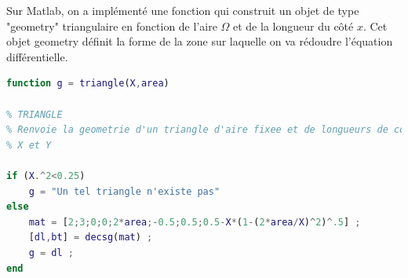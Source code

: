 \documentclass[a4paper,reqno]{article}
\begin{document}
Sur Matlab, on a implémenté une fonction qui construit un objet de type "geometry" triangulaire en fonction de l'aire $\Omega$ et de la longueur du côté $x$. Cet objet geometry définit la forme de la zone sur laquelle on va rédoudre l'équation différentielle. 

\newpage

\begin{lstlisting}[language=Matlab,frame=single,caption=Construction d'une géométrie Triangulaire]
function g = triangle(X,area)

% TRIANGLE
% Renvoie la geometrie d'un triangle d'aire fixee et de longueurs de cote 
% X et Y 

if (X.^2<0.25)
    g = "Un tel triangle n'existe pas" 
else 
    mat = [2;3;0;0;2*area;-0.5;0.5;0.5-X*(1-(2*area/X)^2)^.5] ; 
    [dl,bt] = decsg(mat) ;
    g = dl ;
end
\end{lstlisting}

\end{document}
